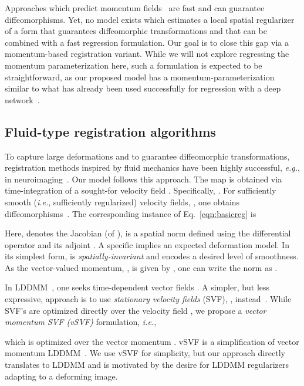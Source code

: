 \documentclass[10pt,twocolumn,letterpaper,table]{article}
\numberwithin{equation}{section}
\theoremstyle{plain}
\theoremstyle{definition}
\def\eg{\emph{e.g.}}  \def\Eg{\emph{E.g.}}
\def\ie{\emph{i.e.}}  \def\Ie{\emph{I.e.}}
\begin{document}
Approaches which predict momentum fields~\cite{yang2016fast,yang2017quicksilver} are fast and can guarantee diffeomorphisms. Yet, no model exists which estimates a local spatial regularizer of a form that guarantees diffeomorphic transformations and that can be combined with a fast regression formulation. Our goal is to close this gap via a momentum-based registration variant. While we will not explore regressing the momentum parameterization here, such a formulation is expected to be straightforward, as our proposed model has a momentum-parameterization similar to what has already been used successfully for regression with a deep network~\cite{yang2017quicksilver}.

\subsection{Fluid-type registration algorithms}
\label{subsection:fluid_registration}

To capture large deformations and to guarantee diffeomorphic transformations, registration methods inspired by fluid mechanics have been highly successful, \eg, in neuroimaging~\cite{avants2009advanced}. Our model follows this approach. The map  is obtained via time-integration of a sought-for velocity field . Specifically, . For sufficiently smooth (\ie, sufficiently regularized) velocity fields, , one obtains diffeomorphisms~\cite{dupuis1998}. The corresponding instance of Eq.~\eqref{eqn:basicreg} is

Here,  denotes the Jacobian (of ),  is a spatial norm defined using the differential operator  and its adjoint . A specific  implies an expected deformation model. In its simplest form,  is \emph{spatially-invariant} and encodes a desired level of smoothness. As the vector-valued momentum, , is given by , one can write the norm as . 

In LDDMM~\cite{beg2005}, one seeks time-dependent vector fields . A simpler, but less expressive, approach is to use \emph{stationary velocity fields} (SVF), , instead~\cite{rohe2017svf}. While SVF's are  optimized directly over the velocity field , we propose a \emph{vector momentum SVF (vSVF)} formulation, \ie, 

which is optimized over the vector momentum . vSVF is a simplification of vector momentum LDDMM~\cite{vialard2012diffeomorphic}. We use vSVF for simplicity, but our approach directly translates to LDDMM and is motivated by the desire for LDDMM regularizers adapting to a deforming image.
\end{document}
